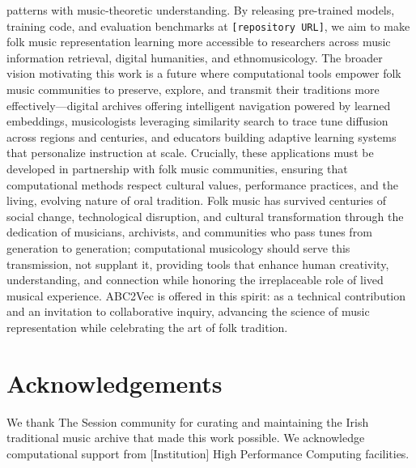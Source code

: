 \documentclass[]{interact}
\theoremstyle{plain}
\theoremstyle{definition}
\theoremstyle{remark}
\begin{document}
patterns with music-theoretic understanding. By releasing pre-trained models, training code, and evaluation benchmarks at \texttt{[repository URL]}, we aim to make folk music representation learning more accessible to researchers across music information retrieval, digital humanities, and ethnomusicology. The broader vision motivating this work is a future where computational tools empower folk music communities to preserve, explore, and transmit their traditions more effectively---digital archives offering intelligent navigation powered by learned embeddings, musicologists leveraging similarity search to trace tune diffusion across regions and centuries, and educators building adaptive learning systems that personalize instruction at scale. Crucially, these applications must be developed in partnership with folk music communities, ensuring that computational methods respect cultural values, performance practices, and the living, evolving nature of oral tradition. Folk music has survived centuries of social change, technological disruption, and cultural transformation through the dedication of musicians, archivists, and communities who pass tunes from generation to generation; computational musicology should serve this transmission, not supplant it, providing tools that enhance human creativity, understanding, and connection while honoring the irreplaceable role of lived musical experience. ABC2Vec is offered in this spirit: as a technical contribution and an invitation to collaborative inquiry, advancing the science of music representation while celebrating the art of folk tradition.

\section*{Acknowledgements}

We thank The Session community for curating and maintaining the Irish traditional music archive that made this work possible. We acknowledge computational support from [Institution] High Performance Computing facilities.



\end{document}
